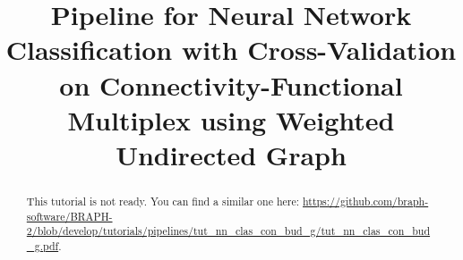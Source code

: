 \documentclass[justified]{tufte-handout}
\title[Classification Cross-Validation Connectivity-Functional Multiplex WU]{Pipeline for Neural Network Classification with Cross-Validation on Connectivity-Functional Multiplex using Weighted Undirected Graph}
\begin{document}
\maketitle

\begin{abstract}
\noindent
This tutorial is not ready. You can find a similar one here: \url{https://github.com/braph-software/BRAPH-2/blob/develop/tutorials/pipelines/tut_nn_clas_con_bud_g/tut_nn_clas_con_bud_g.pdf}.
\end{abstract}
\end{document}

